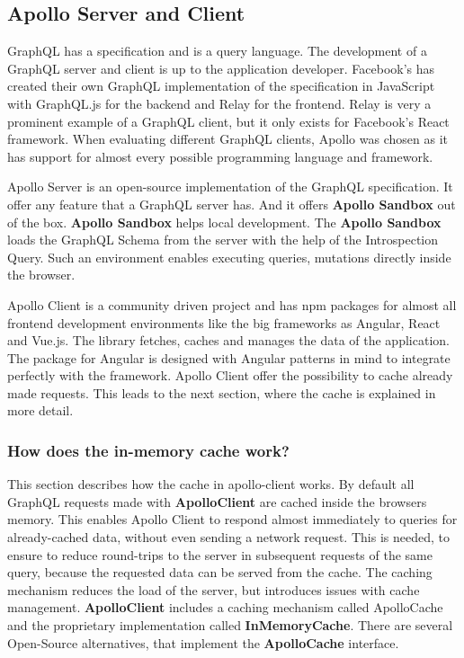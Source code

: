 \subsection{Apollo Server and Client}

GraphQL has a specification and is a query language. The development of a GraphQL server and client is up to the application developer. Facebook's has created their own GraphQL implementation of the specification in JavaScript with GraphQL.js for the backend and Relay for the frontend. Relay is very a prominent example of a GraphQL client, but it only exists for Facebook's React framework. When evaluating different GraphQL clients, Apollo was chosen as it has support for almost every possible programming language and framework.

Apollo Server is an open-source implementation of the GraphQL specification. It offer any feature that a GraphQL server has. And it offers \textbf{Apollo Sandbox} out of the box. \cite{misc:-:apollo-server-introduction} \textbf{Apollo Sandbox} helps local development. The \textbf{Apollo Sandbox} loads the GraphQL Schema from the server with the help of the Introspection Query. \cite{misc:-:apollo-sandbox} Such an environment enables executing queries, mutations directly inside the browser. 

Apollo Client is a community driven project and has npm packages for almost all frontend development environments like the big frameworks as Angular, React and Vue.js. The library fetches, caches and manages the data of the application. The package for Angular is designed with Angular patterns in mind to integrate perfectly with the framework. Apollo Client offer the possibility to cache already made requests. \cite{misc:-:apollo-angular-client-overview} \cite{misc:-:apollo-client-overview} This leads to the next section, where the cache is explained in more detail.

\subsubsection{How does the in-memory cache work?}

This section describes how the cache in apollo-client works. By default all GraphQL requests made with \textbf{ApolloClient} are cached inside the browsers memory. This enables Apollo Client to respond almost immediately to queries for already-cached data, without even sending a network request. This is needed, to ensure to reduce round-trips to the server in subsequent requests of the same query, because the requested data can be served from the cache. The caching mechanism reduces the load of the server, but introduces issues with cache management. \textbf{ApolloClient} includes a caching mechanism called ApolloCache and the proprietary implementation called \textbf{InMemoryCache}. There are several Open-Source alternatives, that implement the \textbf{ApolloCache} interface.


